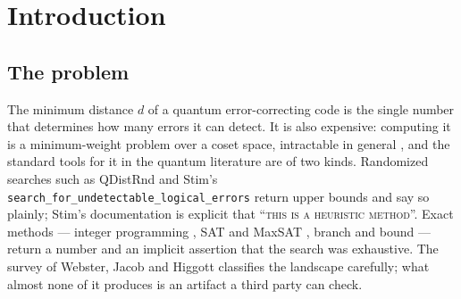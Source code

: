\documentclass[11pt]{amsart}
\theoremstyle{plain}
\theoremstyle{definition}
\theoremstyle{remark}
\begin{document}
\begin{abstract}
We state the trusted base explicitly, separating what is machine-checked per
certificate from the facts that are assumed, and we report the four defects
the audit found, including one latent soundness hole in a checker branch.
We claim priority neither for the distance values, which are Bravyi et al.'s,
nor for machine-checked quantum distance proofs, which are LEAN-QEC's and
whose public repository reports a completed gross-code verification as of
2026-07-10; and we claim no novelty for the profile-normalisation encoding
against automated symmetry-breaking tools, which we did not benchmark. What is
offered here is a certificate format and a trusted base --- four
standard-library readers, $1{,}146$ lines in total, with no solver and no proof
assistant in them --- an independently replayable determination that
$d([[288,12,18]])=18$ with no admitted lemma, a lower bound for
$[[360,12,\le24]]$, and artifacts that outlive the tools that produced them.
\emph{(Correction, 2026-11-17: through v0.17.0 this sentence said ``the first''
twice and counted $1{,}144$ lines; the D4 guard of \S\ref{sec:defects} added
two lines to \texttt{check\_lower.py}.)}
\end{abstract}

\maketitle

\section{Introduction}\label{sec:intro}

\subsection{The problem}
The minimum distance $d$ of a quantum error-correcting code is the single
number that determines how many errors it can detect. It is also expensive:
computing it is a minimum-weight problem over a coset space, intractable in
general \cite{Vardy97}, and the standard tools for it in the quantum
literature are of two kinds. Randomized searches such as QDistRnd
\cite{QDistRnd} and Stim's \texttt{search\_for\_undetectable\_logical\_errors}
\cite{Stim} return upper bounds and say so plainly; Stim's documentation is
explicit that ``\textsc{this is a heuristic method}''. Exact methods ---
integer programming \cite{LandahlAndersonRice}, SAT and MaxSAT
\cite{ChenJafariLai}, branch and bound --- return a number and an implicit
assertion that the search was exhaustive. The survey of Webster, Jacob and
Higgott \cite{WJH} classifies the landscape carefully; what almost none of it
produces is an artifact a third party can check.
\end{document}
